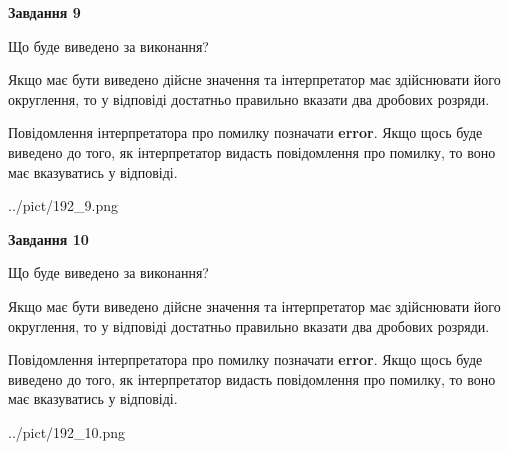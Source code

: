 \documentclass[12pt, ukrainian]{article}
\begin{document}
{\begin {Large}
{\begin {center}\textbf{Завдання 9}\end {center}}\par
Що буде виведено за виконання? \par

Якщо має бути виведено дійсне значення та інтерпретатор має здійснювати його округлення, 
то у відповіді достатньо правильно вказати два дробових розряди.

Повідомлення інтерпретатора про помилку позначати \textbf{error}.
Якщо щось буде виведено до того, як інтерпретатор видасть повідомлення про помилку, 
то воно має вказуватись у відповіді. \par

\begin{center}
	{../pict/192_9.png}
\end{center}
\newpage

{\begin {center}\textbf{Завдання 10}\end {center}}\par
Що буде виведено за виконання? \par

Якщо має бути виведено дійсне значення та інтерпретатор має здійснювати його округлення, 
то у відповіді достатньо правильно вказати два дробових розряди.

Повідомлення інтерпретатора про помилку позначати \textbf{error}.
Якщо щось буде виведено до того, як інтерпретатор видасть повідомлення про помилку, 
то воно має вказуватись у відповіді. \par

\begin{center}
	{../pict/192_10.png}
\end{center}
\newpage

\end {Large}}
\end{document}
